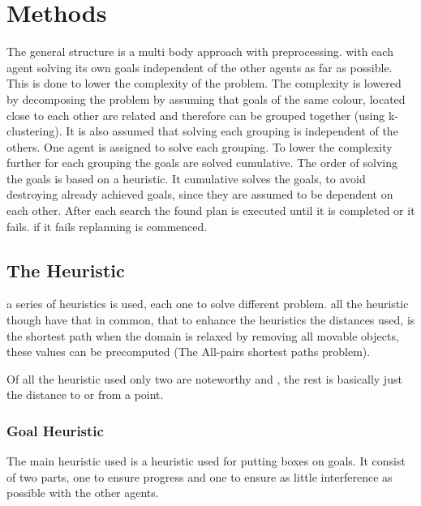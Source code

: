 \documentclass[letterpaper]{article}
\begin{document}
\section{Methods}
%		
%		
%		
	The general structure is a multi body approach with preprocessing. with each agent solving its own goals independent of the other agents as far as possible. This is done to lower the complexity of the problem. The complexity is lowered by decomposing the problem by assuming that goals of the same colour, located close to each other are related and therefore can be grouped together (using k-clustering). It is also assumed that solving each grouping is independent of the others. One agent is assigned to solve each grouping. 
	To lower the complexity further for each grouping the goals are solved cumulative. The order of solving the goals is based on a heuristic. It cumulative solves the goals, to avoid destroying already achieved goals, since they are assumed to be dependent on each other. After each search the found plan is executed until it is completed or it fails. if it fails replanning is commenced.

 
	\subsection{The Heuristic}
		a series of heuristics is used, each one to solve different problem. all the heuristic though have that in common, that to enhance the heuristics the distances used, is the shortest path when the domain is relaxed by removing all movable objects, these values can be precomputed (The All-pairs shortest paths problem).
		
		Of all the heuristic used only two are noteworthy  and , the rest is basically just the distance to or from a point.
		\subsubsection{Goal Heuristic}\label{Goal1}
			The main heuristic used is a heuristic used for putting boxes on goals. It consist of two parts, one to ensure progress and one to ensure as little interference as possible with the other agents.
			
\end{document}
